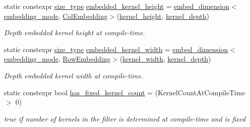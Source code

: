 \begin{DoxyCompactItemize}
static constexpr \hyperlink{namespaceffnn_a63b90a2fd70eb76684eac482a51633e5}{size\-\_\-type} \hyperlink{structffnn_1_1layer_1_1convolution_1_1filter_1_1options_a1f86b4cfe7a30523e5ff50d99708659a}{embedded\-\_\-kernel\-\_\-height} = \hyperlink{namespaceffnn_1_1layer_1_1convolution_a0cca23056b3d9d79e6604c9419814351}{embed\-\_\-dimension}$<$\hyperlink{structffnn_1_1layer_1_1convolution_1_1filter_1_1options_a364919ad62fa093fbf5d142bd4f37d6e}{embedding\-\_\-mode}, \hyperlink{namespaceffnn_1_1layer_1_1convolution_ad420d4eb8edd7c254d1f0aaaad81017fae2ba27e8fa1aed3f003e54947f37d17e}{Col\-Embedding}$>$(\hyperlink{structffnn_1_1layer_1_1convolution_1_1filter_1_1options_a89572b22e67e07c6f68d5c51070b0dbf}{kernel\-\_\-height}, \hyperlink{structffnn_1_1layer_1_1convolution_1_1filter_1_1options_a699036320138871693bcd0ecfb977d6b}{kernel\-\_\-depth})
\begin{DoxyCompactList}\small\item\em Depth embedded kernel height at compile-\/time. \end{DoxyCompactList}\item 
static constexpr \hyperlink{namespaceffnn_a63b90a2fd70eb76684eac482a51633e5}{size\-\_\-type} \hyperlink{structffnn_1_1layer_1_1convolution_1_1filter_1_1options_a9cc6dff082340e5c7388f8878ea3a7f4}{embedded\-\_\-kernel\-\_\-width} = \hyperlink{namespaceffnn_1_1layer_1_1convolution_a0cca23056b3d9d79e6604c9419814351}{embed\-\_\-dimension}$<$\hyperlink{structffnn_1_1layer_1_1convolution_1_1filter_1_1options_a364919ad62fa093fbf5d142bd4f37d6e}{embedding\-\_\-mode}, \hyperlink{namespaceffnn_1_1layer_1_1convolution_ad420d4eb8edd7c254d1f0aaaad81017fa1c03b5145e31615496457aa687a180c2}{Row\-Embedding}$>$(\hyperlink{structffnn_1_1layer_1_1convolution_1_1filter_1_1options_afd97cb92020381b3f2489b92946fdc11}{kernel\-\_\-width}, \hyperlink{structffnn_1_1layer_1_1convolution_1_1filter_1_1options_a699036320138871693bcd0ecfb977d6b}{kernel\-\_\-depth})
\begin{DoxyCompactList}\small\item\em Depth embedded kernel width at compile-\/time. \end{DoxyCompactList}\item 
static constexpr bool \hyperlink{structffnn_1_1layer_1_1convolution_1_1filter_1_1options_afe85a502882816dd562acd349c96b30e}{has\-\_\-fixed\-\_\-kernel\-\_\-count} = (Kernel\-Count\-At\-Compile\-Time $>$ 0)
\begin{DoxyCompactList}\small\item\em {\ttfamily true} if number of kernels in the filter is determined at compile-\/time and is fixed \end{DoxyCompactList}\end{DoxyCompactItemize}


